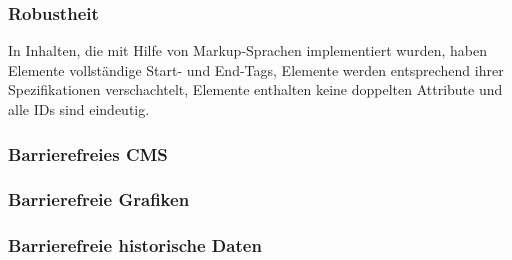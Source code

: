 \subsubsection*{Robustheit}
 In Inhalten, die mit Hilfe von Markup-Sprachen implementiert wurden, haben Elemente vollständige Start- und End-Tags, Elemente werden entsprechend ihrer Spezifikationen verschachtelt, Elemente enthalten keine doppelten Attribute und alle IDs sind eindeutig.


\subsubsection{Barrierefreies CMS}
\newline
{}\newline

\subsubsection{Barrierefreie Grafiken}
\newline
{}\newline

\subsubsection{Barrierefreie historische Daten}
\newline
